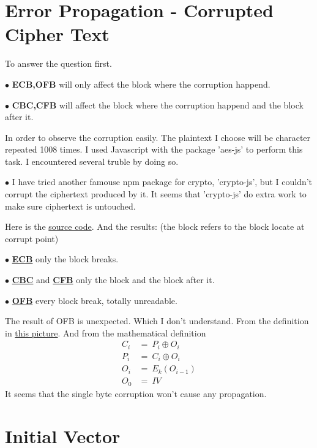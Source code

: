 \documentclass{article}
\begin{document}
\section{Error Propagation - Corrupted Cipher Text}
To answer the question first.
\begin{tlist}{2}
	\item[$\bullet$]\textbf{ECB,OFB} will only affect the block where the corruption happend.
	\item[$\bullet$]\textbf{CBC,CFB} will affect the block where the corruption happend and the block after it.
\end{tlist}
In order to observe the corruption easily. The plaintext I choose will be character  repeated 1008 times.
I used Javascript with the package 'aes-js' to perform this task. I encountered several truble by doing so.
\begin{tlist}{2}
	\item[$\bullet$]I have tried another famouse npm package for crypto, 'crypto-js', but I couldn't corrupt the ciphertext produced by it. It seems that 'crypto-js' do extra work to make sure ciphertext is untouched.
\end{tlist}
Here is the \href{https://github.com/Luna1996/WUSTL/blob/master/571/L2/task3.js}{source code}. And the results: (the block refers to the block locate at corrupt point)
\begin{tlist}{2}
	\item[$\bullet$]
	\href{https://github.com/Luna1996/WUSTL/blob/master/571/L2/ecb.txt}{\textbf{ECB}}
	only the block breaks.
	\item[$\bullet$]
	\href{https://github.com/Luna1996/WUSTL/blob/master/571/L2/cbc.txt}{\textbf{CBC}}
	and
	\href{https://github.com/Luna1996/WUSTL/blob/master/571/L2/cfb.txt}{\textbf{CFB}}
	only the block and the block after it.
	\item[$\bullet$]
	\href{https://github.com/Luna1996/WUSTL/blob/master/571/L2/ofb.txt}{\textbf{OFB}}
	every block break, totally unreadable.
\end{tlist}
The result of OFB is unexpected. Which I don't understand. From the definition in \href{https://i.loli.net/2018/09/24/5ba8a461a5228.png}{this picture}. And from the mathematical definition
$$
	\begin{aligned}
		C_i & =\ P_i\oplus O_i \\
		P_i & =\ C_i\oplus O_i \\
		O_i & =\ E_k(O_{i-1})  \\
		O_0 & =\ IV
	\end{aligned}
$$
It seems that the single byte corruption won't cause any propagation.

\section{Initial Vector}
\subsection{}
\end{document}
